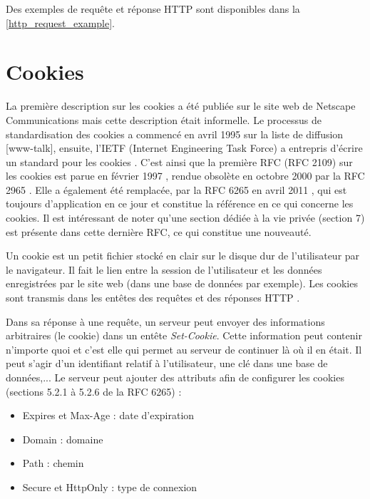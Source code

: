 Des exemples de requête et réponse HTTP sont disponibles dans la \autoref{http_request_example}.


\section{Cookies}
La première description sur les cookies a été publiée sur le site web de Netscape Communications mais cette description était informelle. Le processus de standardisation des cookies a commencé en avril 1995 sur la liste de diffusion [www-talk], ensuite, l'IETF (Internet Engineering Task Force) a entrepris d'écrire un standard pour les cookies \cite{Kristol:2001:HCS:502152.502153}. C'est ainsi que la première RFC (RFC 2109) sur les cookies est parue en février 1997 \cite{IETF_RFC2109}, rendue obsolète en octobre 2000 par la RFC 2965 \cite{IETF_RFC2965}. Elle a également été remplacée, par la RFC 6265 en avril 2011 \cite{IETF_RFC6265}, qui est toujours d'application en ce jour et constitue la référence en ce qui concerne les cookies. Il est intéressant de noter qu'une section dédiée à la vie privée (section 7) est présente dans cette dernière RFC, ce qui constitue une nouveauté.
\newline

Un cookie est un petit fichier stocké en clair sur le disque dur de l'utilisateur par le navigateur. Il fait le lien entre la session de l'utilisateur et les données enregistrées par le site web (dans une base de données par exemple). Les cookies sont transmis dans les entêtes des requêtes et des réponses HTTP \cite{IETF_RFC6265}.
\newline

Dans sa réponse à une requête, un serveur peut envoyer des informations arbitraires (le cookie) dans un entête \textit{Set-Cookie}. Cette information peut contenir n'importe quoi et c'est elle qui permet au serveur de continuer là où il en était. Il peut s'agir d'un identifiant relatif à l'utilisateur, une clé dans une base de données,...
Le serveur peut ajouter des attributs afin de configurer les cookies (sections 5.2.1 à 5.2.6 de la RFC 6265) \cite{IETF_RFC6265} :

\begin{itemize}
	\item Expires et Max-Age : date d'expiration
	\item Domain : domaine
	\item Path : chemin
	\item Secure et HttpOnly : type de connexion
	\newline
\end{itemize}

